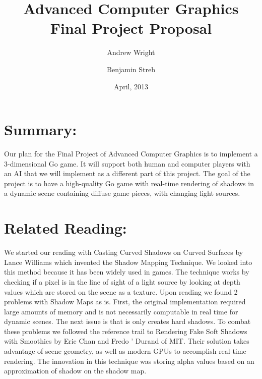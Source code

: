 \documentclass[12pt,a4paper]{report}
\begin{document}
\title{Advanced Computer Graphics Final Project Proposal}
\author{Andrew Wright \and Benjamin Streb}
\date{April, 2013}
\maketitle
\section*{Summary:}
Our plan for the Final Project of Advanced Computer Graphics is to implement a 3-dimensional Go game. It will support both human and computer players with an AI that we will implement as a different part of this project. The goal of the project is to have a high-quality Go game with real-time rendering of shadows in a dynamic scene containing diffuse game pieces, with changing light sources.
\section*{Related Reading:}
We started our reading with Casting Curved Shadows on Curved Surfaces by Lance Williams \cite{williams} which invented the Shadow Mapping Technique. We looked into this method because it has been widely used in games. The technique works by checking if a pixel is in the line of sight of a light source by looking at depth values which are stored on the scene as a texture.  Upon reading we found 2 problems with Shadow Maps as is. First, the original implementation required large amounts of memory and is not necessarily computable in real time for dynamic scenes. The next issue is that is only creates hard shadows. To combat these problems we followed the reference trail to Rendering Fake Soft Shadows with Smoothies by Eric Chan \cite{smoothie} and Fredo ' Durand of MIT. Their solution takes advantage of scene geometry, as well as modern GPUs to accomplish real-time rendering. The innovation in this technique was storing alpha values based on an approximation of shadow on the shadow map.
\end{document}
